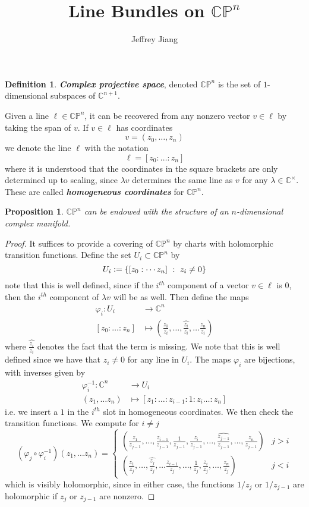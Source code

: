 \documentclass[psamsfonts, 12pt]{amsart}
\newtheorem{prop}[thm]{Proposition}
\theoremstyle{definition}
\newtheorem{defn}[thm]{Definition}
\theoremstyle{remark}
\newcommand{\ib}[1]{\textbf{\textit{#1}}}
\newcommand{\C}{\mathbb{C}}
\newcommand{\CP}{\mathbb{CP}}
\newcommand{\inv}{^{-1}}
\newcommand{\set}[1]{\left\lbrace #1 \right\rbrace}
\newcommand{\defeq}{\vcentcolon=}
\begin{document}
%
\author{Jeffrey Jiang}
%
\title{Line Bundles on $\CP^n$}
%
\setcounter{section}{1}
%
\maketitle
%
\begin{defn}
\ib{Complex projective space}, denoted $\CP^n$ is the set of $1$-dimensional
subspaces of $\C^{n+1}$.
\end{defn}
%
Given a line $\ell \in \CP^n$, it can be recovered from any nonzero vector
$v \in \ell$ by taking the span of $v$. If $v \in \ell$ has coordinates
\[
v = (z_0, \ldots, z_n)
\]
we denote the line $\ell$ with the notation
\[
\ell = [z_0 : \ldots : z_n]
\]
where it is understood that the coordinates in the square brackets are only determined
up to scaling, since $\lambda v$ determines the same line as $v$ for any
$\lambda \in \C^\times$. These are called \ib{homogeneous coordinates} for $\CP^n$.
%
\begin{prop}
$\CP^n$ can be endowed with the structure of an $n$-dimensional complex manifold.
\end{prop}
%
\begin{proof}
It suffices to provide a covering of $\CP^n$ by charts with holomorphic
transition functions. Define the set $U_i \subset \CP^n$ by
\[
U_i \defeq \set{[z_0: \cdots z_n] ~:~ z_i \neq 0}
\]
note that this is well defined, since if the $i^{th}$ component of a
vector $v \in \ell$ is $0$, then the $i^{th}$ component of $\lambda v$ will be
as well. Then define the maps
\begin{align*}
\varphi_i : U_i &\to \C^n \\
[z_0: \ldots : z_n] &\mapsto \left( \frac{z_0}{z_i},\ldots,
\widehat{\frac{z_i}{z_i}}, \ldots \frac{z_n}{z_i} \right)
\end{align*}
where $\widehat{\frac{z_i}{z_i}}$ denotes the fact that the term is missing.
We note that this is well defined since we have that $z_i \neq 0$ for any line
in $U_i$. The maps $\varphi_i$ are bijections, with inverses given by
\begin{align*}
\varphi_i\inv : \C^n &\to U_i \\
(z_1,\ldots z_n) &\mapsto [z_1:\ldots: z_{i-1}: 1 : z_i \ldots : z_n]
\end{align*}
i.e. we insert a $1$ in the $i^{th}$ slot in homogeneous coordinates. We then check
the transition functions. We compute for $i \neq j$
\[
(\varphi_j \circ \varphi_i\inv)(z_1,\ldots z_n)
= \begin{cases}
\left(\frac{z_1}{z_{j-1}}, \ldots ,\frac{z_{i-1}}{z_{j-1}}, \frac{1}{z_{j-1}},
\frac{z_i}{z_{j-1}}, \ldots ,\widehat{\frac{z_{j-1}}{z_{j-1}}} ,
\ldots,\frac{z_n}{z_{j-1}}\right) & j > i \\[20pt]
\left(\frac{z_1}{z_j},\ldots,\widehat{\frac{z_j}{z_j}},\ldots\frac{z_{i-1}}{z_j},
\ldots,\frac{1}{z_j},\frac{z_i}{z_j},\ldots,\frac{z_n}{z_j} \right)
& j < i
\end{cases}
\]
which is visibly holomorphic, since in either case, the functions $1/z_j$ or $1/z_{j-1}$
are holomorphic if $z_j$ or $z_{j-1}$ are nonzero.
\end{proof}
\end{document}
